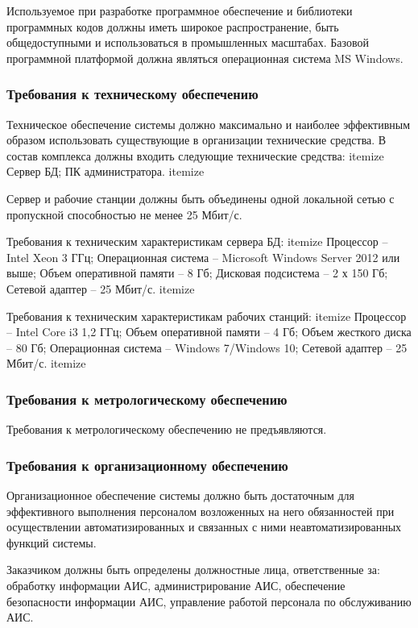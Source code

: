 \documentclass[russian, utf8, 12pt,pointsubsection,floatsubsection]{eskdtext}
\begin{document}
Используемое при разработке программное обеспечение и библиотеки программных кодов должны иметь широкое распространение, быть общедоступными и использоваться в промышленных масштабах. Базовой программной платформой должна являться операционная система MS Windows.

\subsubsection{Требования к техническому обеспечению}
Техническое обеспечение системы должно максимально и наиболее эффективным образом использовать существующие в организации технические средства. В состав комплекса должны входить следующие технические средства:
itemize
Сервер БД;
ПК администратора.
itemize

Сервер и рабочие станции должны быть объединены одной локальной сетью с пропускной способностью не менее 25 Мбит/с.

Требования к техническим характеристикам сервера БД:
itemize
Процессор – Intel Xeon 3 ГГц;
Операционная система – Microsoft Windows Server 2012 или выше;
Объем оперативной памяти – 8 Гб;
Дисковая подсистема – 2 х 150 Гб;
Сетевой адаптер – 25 Мбит/с.
itemize

Требования к техническим характеристикам рабочих станций:
itemize
Процессор – Intel Core i3 1,2 ГГц;
Объем оперативной памяти – 4 Гб;
Объем жесткого диска – 80 Гб;
Операционная система – Windows 7/Windows 10;
Сетевой адаптер – 25 Мбит/с.
itemize


\subsubsection{Требования к метрологическому обеспечению}
Требования к метрологическому обеспечению не предъявляются.

\subsubsection{Требования к организационному обеспечению}
Организационное обеспечение системы должно быть достаточным для эффективного выполнения персоналом возложенных на него обязанностей при осуществлении автоматизированных и связанных с ними неавтоматизированных функций системы.

Заказчиком должны быть определены должностные лица, ответственные за: обработку информации АИС, администрирование АИС, обеспечение безопасности информации АИС, управление работой персонала по обслуживанию АИС.
\end{document}
